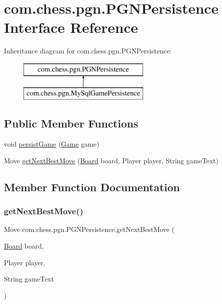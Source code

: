 \hypertarget{interfacecom_1_1chess_1_1pgn_1_1_p_g_n_persistence}{}\section{com.\+chess.\+pgn.\+P\+G\+N\+Persistence Interface Reference}
\label{interfacecom_1_1chess_1_1pgn_1_1_p_g_n_persistence}
Inheritance diagram for com.\+chess.\+pgn.\+P\+G\+N\+Persistence\+:\begin{figure}[H]
\begin{center}
\leavevmode
\includegraphics[height=2.000000cm]{interfacecom_1_1chess_1_1pgn_1_1_p_g_n_persistence}
\end{center}
\end{figure}
\subsection*{Public Member Functions}
\begin{DoxyCompactItemize}
\item 
void \mbox{\hyperlink{interfacecom_1_1chess_1_1pgn_1_1_p_g_n_persistence_a144870869633d521938c6de252a9d653}{persist\+Game}} (\mbox{\hyperlink{classcom_1_1chess_1_1pgn_1_1_game}{Game}} game)
\item 
Move \mbox{\hyperlink{interfacecom_1_1chess_1_1pgn_1_1_p_g_n_persistence_a60257b57a23c0616ea28233c91221429}{get\+Next\+Best\+Move}} (\mbox{\hyperlink{classcom_1_1chess_1_1engine_1_1classic_1_1board_1_1_board}{Board}} board, Player player, String game\+Text)
\end{DoxyCompactItemize}


\subsection{Member Function Documentation}
\mbox{\label{interfacecom_1_1chess_1_1pgn_1_1_p_g_n_persistence_a60257b57a23c0616ea28233c91221429}} 
\subsubsection{\texorpdfstring{getNextBestMove()}{getNextBestMove()}}
{\footnotesize\ttfamily Move com.\+chess.\+pgn.\+P\+G\+N\+Persistence.\+get\+Next\+Best\+Move (\begin{DoxyParamCaption}\item[{\mbox{\hyperlink{classcom_1_1chess_1_1engine_1_1classic_1_1board_1_1_board}{Board}}}]{board,  }\item[{Player}]{player,  }\item[{String}]{game\+Text }\end{DoxyParamCaption})}



